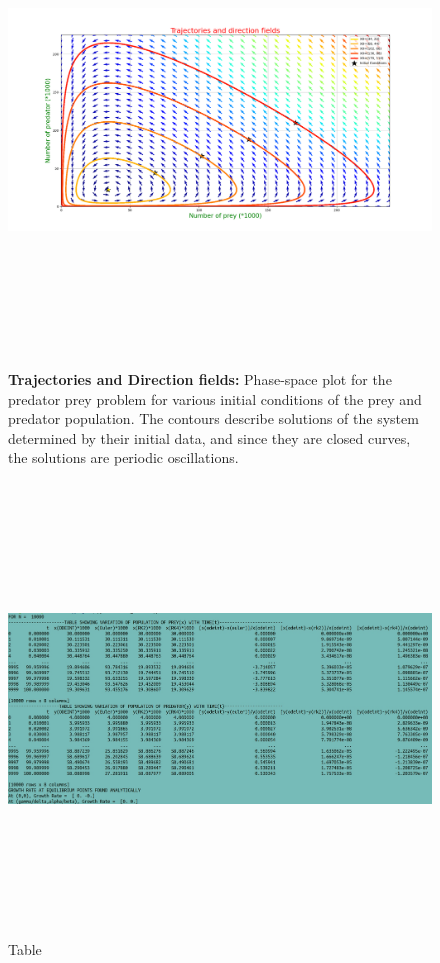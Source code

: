 \documentclass[12pt]{article}
\begin{document}
\newpage
\begin{figure}[h] %
    \centering
    \includegraphics[width=18cm,height=13cm]{Trajcec_DirFields.png}
\caption{\textbf{Trajectories and Direction fields:} Phase-space plot for the predator prey problem for various initial conditions of the prey and predator population. The contours describe solutions of the system determined by their initial data, and since they are closed curves, the solutions are periodic oscillations.}
\end{figure}


\newpage
\begin{figure}[h] %
    \centering
    \includegraphics[width=18cm,height=12cm]{table.jpg}
\caption{Table}
\end{figure}
\end{document}
